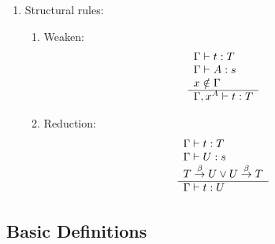 \begin{definition}
\begin{enumerate}
    \item Structural rules:
        \begin{enumerate}
            \item Weaken:
                $$
                \begin{array}{l} 
                    \Gamma \vdash t: T
                    \\
                    \Gamma \vdash A: s
                    \\
                    x \notin \Gamma
                 \\ \hline 
                    \Gamma, x^A \vdash t: T
                \end{array}
                $$

            \item Reduction:
                $$
                \begin{array}{l} 
                    \Gamma \vdash t: T
                    \\
                    \Gamma \vdash U: s
                    \\
                    T \stackrel{\beta}{\to} U \lor U \stackrel{\beta}{\to} T
                 \\ \hline 
                    \Gamma \vdash t: U
                \end{array}
                $$

        \end{enumerate}
    \end{enumerate}
\end{definition}



\subsection{Basic Definitions}

